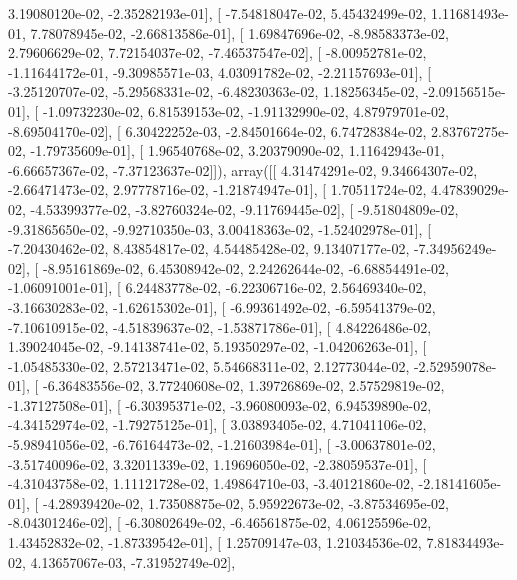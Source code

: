 \documentclass{article}
\begin{document}
          3.19080120e-02,  -2.35282193e-01],
       [ -7.54818047e-02,   5.45432499e-02,   1.11681493e-01,
          7.78078945e-02,  -2.66813586e-01],
       [  1.69847696e-02,  -8.98583373e-02,   2.79606629e-02,
          7.72154037e-02,  -7.46537547e-02],
       [ -8.00952781e-02,  -1.11644172e-01,  -9.30985571e-03,
          4.03091782e-02,  -2.21157693e-01],
       [ -3.25120707e-02,  -5.29568331e-02,  -6.48230363e-02,
          1.18256345e-02,  -2.09156515e-01],
       [ -1.09732230e-02,   6.81539153e-02,  -1.91132990e-02,
          4.87979701e-02,  -8.69504170e-02],
       [  6.30422252e-03,  -2.84501664e-02,   6.74728384e-02,
          2.83767275e-02,  -1.79735609e-01],
       [  1.96540768e-02,   3.20379090e-02,   1.11642943e-01,
         -6.66657367e-02,  -7.37123637e-02]]), array([[  4.31474291e-02,   9.34664307e-02,  -2.66471473e-02,
          2.97778716e-02,  -1.21874947e-01],
       [  1.70511724e-02,   4.47839029e-02,  -4.53399377e-02,
         -3.82760324e-02,  -9.11769445e-02],
       [ -9.51804809e-02,  -9.31865650e-02,  -9.92710350e-03,
          3.00418363e-02,  -1.52402978e-01],
       [ -7.20430462e-02,   8.43854817e-02,   4.54485428e-02,
          9.13407177e-02,  -7.34956249e-02],
       [ -8.95161869e-02,   6.45308942e-02,   2.24262644e-02,
         -6.68854491e-02,  -1.06091001e-01],
       [  6.24483778e-02,  -6.22306716e-02,   2.56469340e-02,
         -3.16630283e-02,  -1.62615302e-01],
       [ -6.99361492e-02,  -6.59541379e-02,  -7.10610915e-02,
         -4.51839637e-02,  -1.53871786e-01],
       [  4.84226486e-02,   1.39024045e-02,  -9.14138741e-02,
          5.19350297e-02,  -1.04206263e-01],
       [ -1.05485330e-02,   2.57213471e-02,   5.54668311e-02,
          2.12773044e-02,  -2.52959078e-01],
       [ -6.36483556e-02,   3.77240608e-02,   1.39726869e-02,
          2.57529819e-02,  -1.37127508e-01],
       [ -6.30395371e-02,  -3.96080093e-02,   6.94539890e-02,
         -4.34152974e-02,  -1.79275125e-01],
       [  3.03893405e-02,   4.71041106e-02,  -5.98941056e-02,
         -6.76164473e-02,  -1.21603984e-01],
       [ -3.00637801e-02,  -3.51740096e-02,   3.32011339e-02,
          1.19696050e-02,  -2.38059537e-01],
       [ -4.31043758e-02,   1.11121728e-02,   1.49864710e-03,
         -3.40121860e-02,  -2.18141605e-01],
       [ -4.28939420e-02,   1.73508875e-02,   5.95922673e-02,
         -3.87534695e-02,  -8.04301246e-02],
       [ -6.30802649e-02,  -6.46561875e-02,   4.06125596e-02,
          1.43452832e-02,  -1.87339542e-01],
       [  1.25709147e-03,   1.21034536e-02,   7.81834493e-02,
          4.13657067e-03,  -7.31952749e-02],
\end{document}
